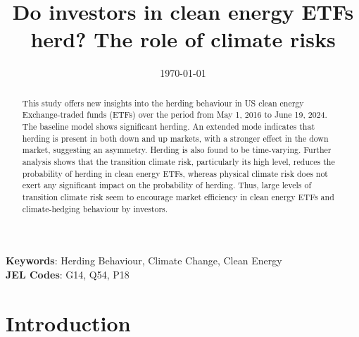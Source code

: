 \documentclass[
  letterpaper,
  DIV=11,
  numbers=noendperiod]{scrartcl}
\author{}
\date{}
\begin{document}
\title{Do investors in clean energy ETFs herd? The role of climate risks}



\date{\today}
\maketitle

\begin{abstract}

This study offers new insights into the herding behaviour in US clean energy Exchange-traded funds (ETFs) over the period from May 1, 2016 to June 19, 2024. 
The baseline model shows significant herding. An extended mode indicates that herding is present in both down and up markets, with a stronger effect in the down market, suggesting an asymmetry. 
Herding is also found to be time-varying. Further analysis shows that the transition climate risk, particularly its high level, reduces the probability of herding in clean energy ETFs, whereas physical climate risk does not exert any significant impact on the probability of herding. 
Thus, large levels of transition climate risk seem to encourage market efficiency in clean energy ETFs  and climate-hedging behaviour by investors.

\end{abstract}

\noindent\textbf{Keywords}: Herding Behaviour, Climate Change, Clean Energy
\\
\textbf{JEL Codes}: G14, Q54, P18
\newpage


\section{Introduction}\label{introduction}
\end{document}
